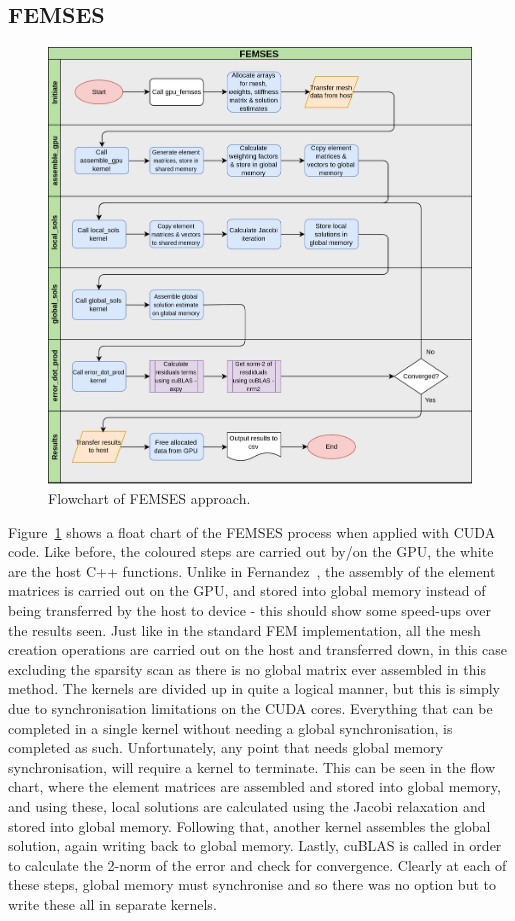 \subsection{FEMSES}\label{femses}

\begin{figure}
	\centering
	\includegraphics[width=0.9\linewidth]{Figures/femses_flow}
	\caption{Flowchart of FEMSES approach.}
	\label{fig:femsesflow}
\end{figure}

Figure~\ref{fig:femsesflow} shows a float chart of the FEMSES process when applied with CUDA code. Like before, the coloured steps are carried out by/on the GPU, the white are the host C++ functions. Unlike in Fernandez~\cite{femses}, the assembly of the element matrices is carried out on the GPU, and stored into global memory instead of being transferred by the host to device - this should show some speed-ups over the results seen. Just like in the standard FEM implementation, all the mesh creation operations are carried out on the host and transferred down, in this case excluding the sparsity scan as there is no global matrix ever assembled in this method. The kernels are divided up in quite a logical manner, but this is simply due to synchronisation limitations on the CUDA cores. Everything that can be completed in a single kernel without needing a global synchronisation, is completed as such. Unfortunately, any point that needs global memory synchronisation, will require a kernel to terminate. This can be seen in the flow chart, where the element matrices are assembled and stored into global memory, and using these, local solutions are calculated using the Jacobi relaxation and stored into global memory. Following that, another kernel assembles the global solution, again writing back to global memory. Lastly, cuBLAS is called in order to calculate the 2-norm of the error and check for convergence. Clearly at each of these steps, global memory must synchronise and so there was no option but to write these all in separate kernels.

